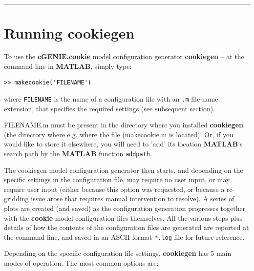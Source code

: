 \vspace{1mm}\noindent\rule{4cm}{0.5pt}\vspace{2mm}

\newpage

\section{Running cookiegen}


To use the \textbf{cGENIE.cookie} model configuration generator \textbf{cookiegen} -- at the command line in \textbf{MATLAB}, simply type:

\vspace{-2mm}\small\begin{verbatim}
>> makecookie('FILENAME')
\end{verbatim}\normalsize\vspace{-2mm}

\noindent where \texttt{FILENAME} is the name of a configuration file with an \texttt{.m} file-name extension, that specifies the required settings (see subsequent section).

\textsf{\footnotesize FILENAME.m} must be present in the directory where you installed \textbf{cookiegen} (the directory where e.g. where the file (\textsf{\footnotesize makecookie.m} is located). \uline{Or}, if you would like to store it elsewhere, you will need to 'add' its location \textbf{MATLAB}'s search path by the \textbf{MATLAB} function \texttt{addpath}.

The \textsf{\footnotesize cookiegen} model configuration generator then starts, and depending on the specific settings in the configuration file, may require no user input, or may require user input (either because this option was requested, or because a re-gridding issue arose that requires manual intervention to resolve). A series of plots are created (and saved) as the configuration generation progresses together with the \textbf{cookie} model configuration files themselves. All the various steps plus details of how the contents of the configuration files are generated are reported at the command line, and saved in an ASCII format \texttt{*.log} file for future reference.

\vspace{1mm}
\noindent Depending on the specific configuration file settings, \textbf{cookiegen} has 5 main modes of operation. The most common options are:

